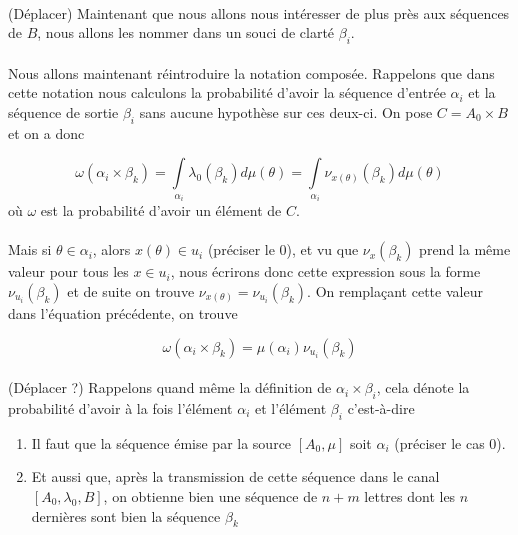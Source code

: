 	\paragraph{}
	(Déplacer) Maintenant que nous allons nous intéresser de plus près aux séquences de $B$, nous allons les nommer dans un souci
	de clarté $\beta_i$.
	
	\paragraph{}
	Nous allons maintenant réintroduire la notation composée. Rappelons que dans cette notation nous calculons la probabilité d'avoir la séquence
	d'entrée $\alpha_i$ et la séquence de sortie $\beta_i$ sans aucune hypothèse sur ces deux-ci. On pose $C = A_0 \times B$ et on a donc
	
	
	\[\omega(\alpha_i\times\beta_k)=\int\limits_{\alpha_i}\lambda_0(\beta_k)d\mu(\theta)=\int\limits_{\alpha_i}\nu_{x(\theta)}(\beta_k)d\mu(\theta)\]
	où $\omega$ est la probabilité d'avoir un élément de $C$.
	
	\paragraph{}
	Mais si $\theta \in \alpha_i$, alors $x(\theta) \in u_i$ (préciser le 0), et vu que $\nu_x(\beta_k)$ prend la même valeur
	pour tous les $x \in u_i$, nous écrirons donc cette expression sous la forme $\nu_{u_i}(\beta_k)$ et de suite on trouve $\nu_{x(\theta)}=\nu_{u_i}(\beta_k)$.
	On remplaçant cette valeur dans l'équation précédente, on trouve
	
	\[\omega(\alpha_i\times\beta_k)=\mu(\alpha_i)\nu_{u_i}(\beta_k)\]
	
	\paragraph{} (Déplacer ?)
	Rappelons quand même la définition de $\alpha_i \times \beta_i$, cela dénote la probabilité d'avoir à la fois l'élément $\alpha_i$ et l'élément $\beta_i$ c'est-à-dire
	\begin{enumerate}
		\item Il faut que la séquence émise par la source $[A_0,\mu]$ soit $\alpha_i$ (préciser le cas 0).
		\item Et aussi que, après la transmission de cette séquence dans le canal $[A_0,\lambda_0,B]$, on obtienne bien une séquence de $n+m$ lettres dont les $n$ 
		dernières sont bien la séquence $\beta_k$
	\end{enumerate} 
	
